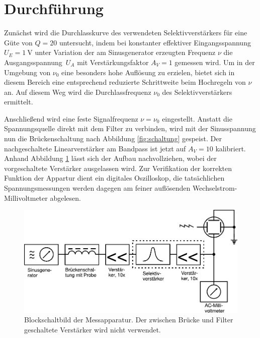 \section{Durchführung}
\label{sec:durchführung}

Zunächst wird die Durchlasskurve des verwendeten Selektivverstärkers für eine Güte von $Q = 20$ untersucht, indem bei konstanter
effektiver Eingangsspannung $U_E = \qty{1}{\volt}$ unter Variation der am Sinusgenerator erzeugten Frequenz $\nu$ die
Ausgangsspannung~$U_{\! A}$ mit Verstärkungsfaktor $A_V = 1$ gemessen wird. Um in der Umgebung von $\nu_0$ eine besonders hohe
Auflösung zu erzielen, bietet sich in diesem Bereich eine entsprechend reduzierte Schrittweite beim Hochregeln von $\nu$ an.
Auf diesem Weg wird die Durchlassfrequenz $\nu_0$ des Selektivverstärkers ermittelt.

Anschließend wird eine feste Signalfrequenz $\nu = \nu_0$ eingestellt. Anstatt die Spannungsquelle direkt mit dem Filter zu verbinden,
wird mit der Sinusspannung nun die Brückenschaltung nach Abbildung \ref{fig:schaltung} gespeist. Der nachgeschaltete Linearverstärker
am Bandpass ist jetzt auf $A_V = 10$ kalibriert. Anhand Abbildung \ref{fig:schaltbild} lässt sich der Aufbau nachvollziehen, wobei der
vorgeschaltete Verstärker ausgelassen wird. Zur Verifikation der korrekten Funktion der Appartur dient ein digitales Oszilloskop, die
tatsächlichen Spannungsmessungen werden dagegen am feiner auflösenden Wechselstrom-Millivoltmeter abgelesen. 

\begin{figure}[H]
	\centering
	\includegraphics[width=1\linewidth]{content/grafik/schaltbild.pdf}
	\caption{Blockschaltbild der Messapparatur. Der zwischen Brücke und Filter geschaltete Verstärker wird nicht verwendet.}
	\label{fig:schaltbild}
\end{figure}

